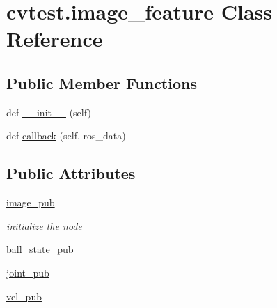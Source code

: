 \hypertarget{classcvtest_1_1image__feature}{}\section{cvtest.\+image\+\_\+feature Class Reference}
\label{classcvtest_1_1image__feature}
\subsection*{Public Member Functions}
\begin{DoxyCompactItemize}
\item 
def \hyperlink{classcvtest_1_1image__feature_a8300aca8e0b2bc58a3a170be90158834}{\+\_\+\+\_\+init\+\_\+\+\_\+} (self)
\item 
def \hyperlink{classcvtest_1_1image__feature_a7cbc351faa6f06da94020226fffabe7f}{callback} (self, ros\+\_\+data)
\end{DoxyCompactItemize}
\subsection*{Public Attributes}
\begin{DoxyCompactItemize}
\item 
\hyperlink{classcvtest_1_1image__feature_a534a9df53a4263a7a4b28e0033b520d6}{image\+\_\+pub}
\begin{DoxyCompactList}\small\item\em initialize the node \end{DoxyCompactList}\item 
\hyperlink{classcvtest_1_1image__feature_ab403e0a9a287776c122a37bf00d70d4f}{ball\+\_\+state\+\_\+pub}
\item 
\hyperlink{classcvtest_1_1image__feature_a6099e7721ccd9571b2d1f94962479e21}{joint\+\_\+pub}
\item 
\hyperlink{classcvtest_1_1image__feature_a375ac203248e8ffb540b38714b6e1bca}{vel\+\_\+pub}
\end{DoxyCompactItemize}
